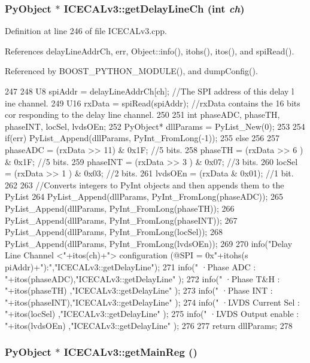 \hypertarget{classICECALv3_a7a1c1706a455903f42bb9a5257d94a78}{
\subsubsection[{getDelayLineCh}]{\setlength{\rightskip}{0pt plus 5cm}PyObject $\ast$ ICECALv3::getDelayLineCh (int {\em ch})}}
\label{classICECALv3_a7a1c1706a455903f42bb9a5257d94a78}


Definition at line 246 of file ICECALv3.cpp.

References delayLineAddrCh, err, Object::info(), itohs(), itos(), and spiRead().

Referenced by BOOST\_\-PYTHON\_\-MODULE(), and dumpConfig().


\begin{DoxyCode}
247 {                            
248     U8 spiAddr = delayLineAddrCh[ch];           //The SPI address of this delay l
      ine channel.
249     U16 rxData = spiRead(spiAddr);              //rxData contains the 16 bits cor
      responding to the delay line channel.
250 
251     int phaseADC, phaseTH, phaseINT, locSel, lvdsOEn;
252     PyObject* dllParams = PyList_New(0);
253 
254     if(err) PyList_Append(dllParams, PyInt_FromLong(-1));
255     else
256     {
257         phaseADC = (rxData >> 11) & 0x1F;       //5 bits.
258         phaseTH  = (rxData >> 6 ) & 0x1F;       //5 bits.
259         phaseINT = (rxData >> 3 ) & 0x07;       //3 bits.
260         locSel   = (rxData >> 1 ) & 0x03;       //2 bits.
261         lvdsOEn  = (rxData & 0x01);                 //1 bit.
262 
263         //Converts integers to PyInt objects and then appends them to the PyList
264         PyList_Append(dllParams, PyInt_FromLong(phaseADC));
265         PyList_Append(dllParams, PyInt_FromLong(phaseTH));
266         PyList_Append(dllParams, PyInt_FromLong(phaseINT));
267         PyList_Append(dllParams, PyInt_FromLong(locSel));
268         PyList_Append(dllParams, PyInt_FromLong(lvdsOEn));
269 
270         info("Delay Line Channel <"+itos(ch)+"> configuration (@SPI = 0x"+itohs(s
      piAddr)+"):","ICECALv3::getDelayLine");
271         info("   ·Phase ADC          : "+itos(phaseADC),"ICECALv3::getDelayLine"
      );
272         info("   ·Phase T&H          : "+itos(phaseTH) ,"ICECALv3::getDelayLine"
      );
273         info("   ·Phase INT          : "+itos(phaseINT),"ICECALv3::getDelayLine"
      );
274         info("   ·LVDS Current Sel   : "+itos(locSel)  ,"ICECALv3::getDelayLine"
      );
275         info("   ·LVDS Output enable : "+itos(lvdsOEn) ,"ICECALv3::getDelayLine"
      );
276     }
277     return dllParams;
278 }
\end{DoxyCode}
\hypertarget{classICECALv3_a4a414d23c1e199b446dc876161338148}{
\subsubsection[{getMainReg}]{\setlength{\rightskip}{0pt plus 5cm}PyObject $\ast$ ICECALv3::getMainReg ()}}
\label{classICECALv3_a4a414d23c1e199b446dc876161338148}


